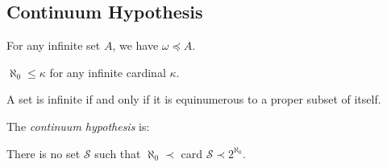 \subsection{Continuum Hypothesis}\label{continuum}

\begin{proposition}
For any infinite set $A$, we have $\omega \preceq A$.
\end{proposition}

\begin{proposition}
$\aleph_0 \leq \kappa$ for any infinite cardinal $\kappa$.
\end{proposition}

\begin{corollary}
A set is infinite if and only if it is equinumerous to a proper subset of itself.
\end{corollary}

\noindent The \emph{continuum hypothesis} is:
\begin{center}
There is no set $\mathcal{S}$ such that $\aleph_0 \prec$ card $\mathcal{S} \prec 2^{\aleph_0}.$
\end{center}